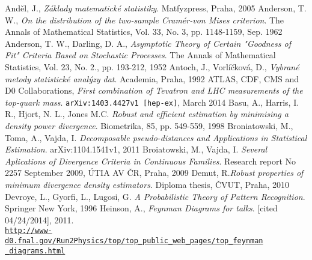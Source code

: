 \begin{thebibliography}{10}

%

Anděl, J., {\em Základy matematické statistiky}. Matfyzpress, Praha, 2005
Anderson, T. W., {\em On the distribution of the two-sample Cram\'er-von Mises criterion}. The Annals of Mathematical Statistics, Vol. 33, No. 3, pp. 1148-1159, Sep. 1962
Anderson, T. W., Darling, D. A., {\em Asymptotic Theory of Certain "Goodness of Fit" Criteria Based on Stochastic Processes}. The Annals of Mathematical Statistics, Vol. 23, No. 2., pp. 193-212, 1952
Antoch, J., Vorlíčková, D., {\em Vybrané metody statistické analýzy dat}. Academia, Praha, 1992
ATLAS, CDF, CMS and D0 Collaborations, {\em First combination of Tevatron and LHC measurements of the top-quark mass}. \texttt{arXiv:1403.4427v1 [hep-ex]}, March 2014
Basu, A., Harris, I. R., Hjort, N. L., Jones M.C. {\em Robust and efficient estimation by minimising a density power divergence}. Biometrika, 85, pp. 549-559, 1998
Broniatowski, M., Toma, A., Vajda, I. {\em Decomposable pseudo-distances and Applications in Statistical Estimation}. arXiv:1104.1541v1, 2011
Broiatowski, M., Vajda, I. {\em Several Aplications of Divergence Criteria in Continuous Families}. Research report No 2257 September 2009, ÚTIA AV ČR, Praha, 2009
Demut, R.{\em Robust properties of minimum divergence density estimators}. Diploma thesis, ČVUT, Praha, 2010
Devroye, L., Gyorfi, L., Lugosi, G. {\em A Probabilistic Theory of Pattern Recognition}. Springer New York, 1996
Heinson, A., {\em Feynman Diagrams for talks}. [cited 04/24/2014], 2011. \\ \href{http://www-d0.fnal.gov/Run2Physics/top/top_public_web_pages/top_feynman_diagrams.html}{\texttt{http://www-d0.fnal.gov/Run2Physics/top/top\_public\_web\_pages/top\_feynman}} \\
\href{http://www-d0.fnal.gov/Run2Physics/top/top_public_web_pages/top_feynman_diagrams.html}{\texttt{\_diagrams.html}}\\

\end{thebibliography}
